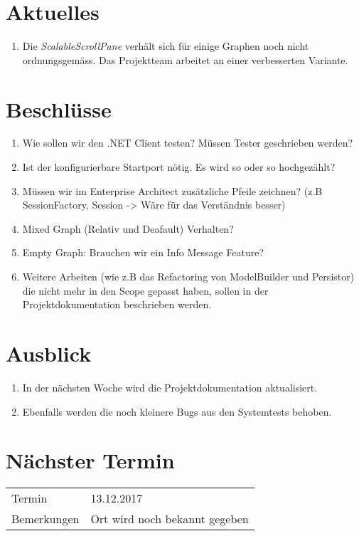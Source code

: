 \documentclass[11pt, a4paper,oneside]{scrartcl}
\begin{document}
	\section{Aktuelles}
		\begin{enumerate}
		\item Die \textit{ScalableScrollPane} verhält sich für einige Graphen noch nicht ordnungsgemäss. Das Projektteam arbeitet an einer verbesserten Variante.
	\end{enumerate} 
	
	\section{Beschlüsse}
	\begin{enumerate}
		\item Wie sollen wir den .NET Client testen? Müssen Tester geschrieben werden?
		\item Ist der konfigurierbare Startport nötig. Es wird so oder so hochgezählt?
		\item Müssen wir im Enterprise Architect zusätzliche Pfeile zeichnen? (z.B SessionFactory, Session -> Wäre für das Verständnis besser)
		\item Mixed Graph (Relativ und Deafault) Verhalten?
		\item Empty Graph: Brauchen wir ein Info Message Feature?
		\item Weitere Arbeiten (wie z.B das Refactoring von ModelBuilder und Persistor) die nicht mehr in den Scope gepasst haben, sollen in der Projektdokumentation beschrieben werden.
	\end{enumerate}

	\section{Ausblick}
	\begin{enumerate}
		\item In der nächsten Woche wird die Projektdokumentation aktualisiert. 
		\item Ebenfalls werden die noch kleinere Bugs aus den Systemtests behoben.
	\end{enumerate}
	
	\section{Nächster Termin}
	\begin{tabu} to \linewidth {l X }
		\toprule
		Termin & 13.12.2017  \\
		Bemerkungen & Ort wird noch bekannt gegeben  \\
		\bottomrule
	\end{tabu}
	
\end{document}
